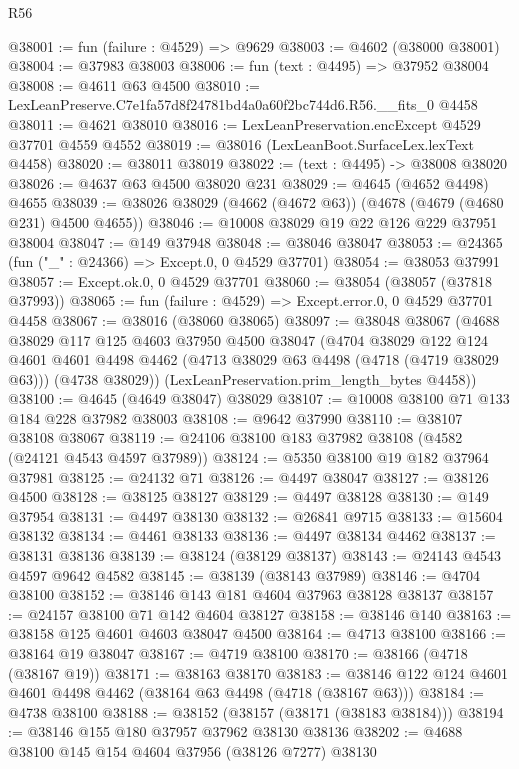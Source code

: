 \begin{lexlean}{R56}
\begin{coremodule}
@38001 := fun (failure : @4529) => @9629
@38003 := @4602 (@38000 @38001)
@38004 := @37983 @38003
@38006 := fun (text : @4495) => @37952 @38004
@38008 := @4611 @63 @4500
@38010 := LexLeanPreserve.C7e1fa57d8f24781bd4a0a60f2bc744d6.R56.__fits_0 @4458
@38011 := @4621 @38010
@38016 := LexLeanPreservation.encExcept @4529 @37701 @4559 @4552
@38019 := @38016 (LexLeanBoot.SurfaceLex.lexText @4458)
@38020 := @38011 @38019
@38022 := (text : @4495) -> @38008 @38020
@38026 := @4637 @63 @4500 @38020 @231
@38029 := @4645 (@4652 @4498) @4655
@38039 := @38026 @38029 (@4662 (@4672 @63)) (@4678 (@4679 (@4680 @231) @4500 @4655))
@38046 := @10008 @38029 @19 @22 @126 @229 @37951 @38004
@38047 := @149 @37948
@38048 := @38046 @38047
@38053 := @24365 (fun ("_" : @24366) => Except.{0, 0} @4529 @37701)
@38054 := @38053 @37991
@38057 := Except.ok.{0, 0} @4529 @37701
@38060 := @38054 (@38057 (@37818 @37993))
@38065 := fun (failure : @4529) => Except.error.{0, 0} @4529 @37701 @4458
@38067 := @38016 (@38060 @38065)
@38097 := @38048
    @38067
    (@4688
      @38029
      @117
      @125
      @4603
      @37950
      @4500
      @38047
      (@4704
        @38029
        @122
        @124
        @4601
        @4601
        @4498
        @4462
        (@4713 @38029 @63 @4498 (@4718 (@4719 @38029 @63)))
        (@4738 @38029))
      (LexLeanPreservation.prim_length_bytes @4458))
@38100 := @4645 (@4649 @38047) @38029
@38107 := @10008 @38100 @71 @133 @184 @228 @37982 @38003
@38108 := @9642 @37990
@38110 := @38107 @38108 @38067
@38119 := @24106 @38100 @183 @37982 @38108 (@4582 (@24121 @4543 @4597 @37989))
@38124 := @5350 @38100 @19 @182 @37964 @37981
@38125 := @24132 @71
@38126 := @4497 @38047
@38127 := @38126 @4500
@38128 := @38125 @38127
@38129 := @4497 @38128
@38130 := @149 @37954
@38131 := @4497 @38130
@38132 := @26841 @9715
@38133 := @15604 @38132
@38134 := @4461 @38133
@38136 := @4497 @38134 @4462
@38137 := @38131 @38136
@38139 := @38124 (@38129 @38137)
@38143 := @24143 @4543 @4597 @9642 @4582
@38145 := @38139 (@38143 @37989)
@38146 := @4704 @38100
@38152 := @38146 @143 @181 @4604 @37963 @38128 @38137
@38157 := @24157 @38100 @71 @142 @4604 @38127
@38158 := @38146 @140
@38163 := @38158 @125 @4601 @4603 @38047 @4500
@38164 := @4713 @38100
@38166 := @38164 @19 @38047
@38167 := @4719 @38100
@38170 := @38166 (@4718 (@38167 @19))
@38171 := @38163 @38170
@38183 := @38146 @122 @124 @4601 @4601 @4498 @4462 (@38164 @63 @4498 (@4718 (@38167 @63)))
@38184 := @4738 @38100
@38188 := @38152 (@38157 (@38171 (@38183 @38184)))
@38194 := @38146 @155 @180 @37957 @37962 @38130 @38136
@38202 := @4688 @38100 @145 @154 @4604 @37956 (@38126 @7277) @38130

\end{coremodule}
\end{lexlean}
